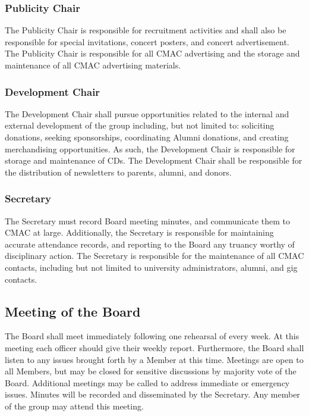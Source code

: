 \documentclass{article}
\begin{document}
\subsubsection{Publicity Chair}

The Publicity Chair is responsible for recruitment activities and shall also be
responsible for special invitations, concert posters, and concert
advertisement. The Publicity Chair is responsible for all CMAC advertising and
the storage and maintenance of all CMAC advertising materials.

\subsubsection{Development Chair}

The Development Chair shall pursue opportunities related to the internal
and external development of the group including, but not limited to:
soliciting donations, seeking sponsorships, coordinating Alumni donations, and
creating merchandising opportunities. As such, the Development Chair is
responsible for storage and maintenance of CDs. The Development
Chair shall be responsible for the distribution of newsletters to
parents, alumni, and donors.

\subsubsection{Secretary}

The Secretary must record Board meeting minutes, and communicate them to CMAC at
large. Additionally, the Secretary is responsible for maintaining accurate
attendance records, and reporting to the Board any truancy worthy of
disciplinary action. The Secretary is responsible for the maintenance of all
CMAC contacts, including but not limited to university administrators, alumni,
and gig contacts.

\subsection{Meeting of the Board}

The Board shall meet immediately following one rehearsal of every week. At this
meeting each officer should give their weekly report.  Furthermore, the Board
shall listen to any issues brought forth by a Member at this time. Meetings are
open to all Members, but may be closed for sensitive discussions by majority
vote of the Board. Additional meetings may be called to address immediate or
emergency issues. Minutes will be recorded and disseminated by the
Secretary. Any member of the group may attend this meeting.
\end{document}
